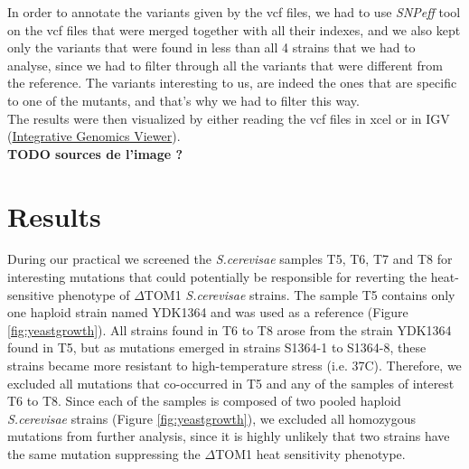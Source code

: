 \documentclass[10pt,a4paper]{article}
\begin{document}
\noindent In order to annotate the variants given by the vcf files, we had to use \textit{SNPeff} tool on the vcf files that were merged together with all their indexes, and we also kept only the variants that were found in less than all 4 strains that we had to analyse, since we had to filter through all the variants that were different from the reference. The variants interesting to us, are indeed the ones that are specific to one of the mutants, and that’s why we had to filter this way.\\

\noindent The results were then visualized by either reading the vcf files in xcel or in IGV (\href{http://software.broadinstitute.org/software/igv/}{Integrative Genomics Viewer}).\\


\textbf{TODO sources de l'image ?}

\section*{Results}
During our practical we screened the \textit{S.cerevisae} samples T5, T6, T7 and T8 for interesting mutations that could potentially be responsible for reverting the heat-sensitive phenotype of $\Delta$TOM1 \textit{S.cerevisae} strains. The sample T5 contains only one haploid strain named YDK1364 and was used as a reference (Figure \ref{fig:yeastgrowth}). All strains found in T6 to T8 arose from the strain YDK1364 found in T5, but as mutations emerged in strains S1364-1 to S1364-8, these strains became more resistant to high-temperature stress (i.e. 37\degree C). Therefore, we excluded all mutations that co-occurred in T5 and any of the samples of interest T6 to T8. Since each of the samples is composed of two pooled haploid \textit{S.cerevisae} strains (Figure \ref{fig:yeastgrowth}), we excluded all homozygous mutations from further analysis, since it is highly unlikely that two strains have the same mutation suppressing the $\Delta$TOM1 heat sensitivity phenotype.
\end{document}
